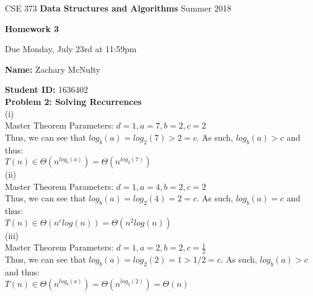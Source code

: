 \documentclass[12pt,a4paper]{article}
\begin{document}
%
%
\begin{center}
CSE 373    \hspace{0.4 cm}  
{\bf Data Structures and Algorithms }
  \hspace{0.4 cm}   Summer 2018
\end{center} 
\vspace{-7 mm}
\noindent \hrulefill
\vspace{3 mm}


%
%

\begin{center}
{\bf \Large Homework 3}

Due Monday, July 23rd at 11:59pm
\end{center}


{\bf Name:} Zachary McNulty

{\bf Student ID:} 1636402\\

%
%

{\bf\large Problem 2: Solving Recurrences}\\


(i)\\ 
Master Theorem Parameters: $d = 1, a = 7, b = 2, c = 2$ \\
Thus, we can see that $log_b (a) = log_2 (7) > 2 = c$. As such, $log_b (a) > c$ and thus: \\ 
$ T(n) \in \Theta(n^{log_b (a)}) = 	\Theta(n^{log_2 (7)})$ \\

(ii) \\
Master Theorem Parameters: $d = 1, a = 4, b = 2, c = 2$ \\
Thus, we can see that $log_b (a) = log_2 (4) = 2 = c$. As such, $log_b (a) = c$ and thus: \\
$T(n) \in \Theta(n^c log (n)) = \Theta(n^2 log (n))$ \\

(iii) \\
Master Theorem Parameters: $d = 1, a = 2, b = 2, c = \frac{1}{2}$ \\
Thus, we can see that $log_b (a) = log_2 (2) = 1 > 1/2 = c$. As such, $log_b (a) > c$ and thus: \\ 
$T(n) \in \Theta(n^{log_b (a)}) = \Theta(n^{log_2 (2)}) = \Theta(n)$\\
\end{document}

